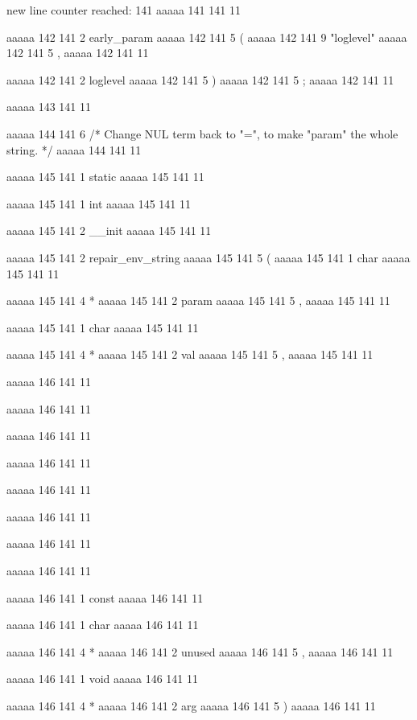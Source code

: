 new line counter reached: 141
aaaaa 141 141
11


aaaaa 142 141
2
early_param
aaaaa 142 141
5
(
aaaaa 142 141
9
"loglevel"
aaaaa 142 141
5
,
aaaaa 142 141
11
 
aaaaa 142 141
2
loglevel
aaaaa 142 141
5
)
aaaaa 142 141
5
;
aaaaa 142 141
11


aaaaa 143 141
11


aaaaa 144 141
6
/* Change NUL term back to "=", to make "param" the whole string. */
aaaaa 144 141
11


aaaaa 145 141
1
static
aaaaa 145 141
11
 
aaaaa 145 141
1
int
aaaaa 145 141
11
 
aaaaa 145 141
2
__init
aaaaa 145 141
11
 
aaaaa 145 141
2
repair_env_string
aaaaa 145 141
5
(
aaaaa 145 141
1
char
aaaaa 145 141
11
 
aaaaa 145 141
4
*
aaaaa 145 141
2
param
aaaaa 145 141
5
,
aaaaa 145 141
11
 
aaaaa 145 141
1
char
aaaaa 145 141
11
 
aaaaa 145 141
4
*
aaaaa 145 141
2
val
aaaaa 145 141
5
,
aaaaa 145 141
11


aaaaa 146 141
11
	
aaaaa 146 141
11
	
aaaaa 146 141
11
	
aaaaa 146 141
11
	
aaaaa 146 141
11
 
aaaaa 146 141
11
 
aaaaa 146 141
11
 
aaaaa 146 141
11
 
aaaaa 146 141
1
const
aaaaa 146 141
11
 
aaaaa 146 141
1
char
aaaaa 146 141
11
 
aaaaa 146 141
4
*
aaaaa 146 141
2
unused
aaaaa 146 141
5
,
aaaaa 146 141
11
 
aaaaa 146 141
1
void
aaaaa 146 141
11
 
aaaaa 146 141
4
*
aaaaa 146 141
2
arg
aaaaa 146 141
5
)
aaaaa 146 141
11


